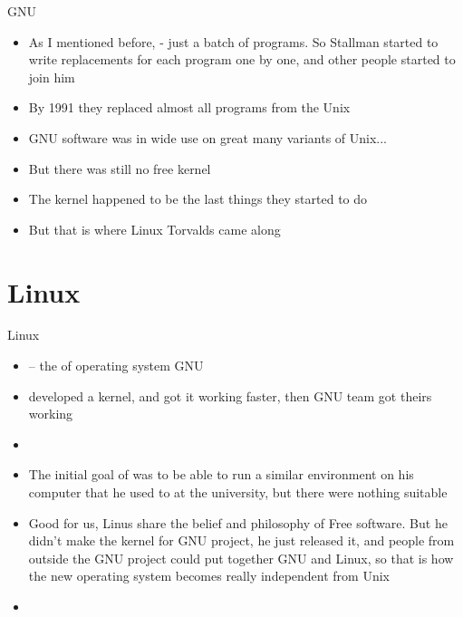 \documentclass[usenames,dvipsnames,10pt,aspectratio=169]{beamer}
\begin{document}
\begin{frame}{GNU}
    \begin{itemize}
        \item As I mentioned before,  - just a batch of programs. So Stallman started to write replacements for each program one by one, and other people started to join him
        \item By 1991 they replaced almost all programs from the Unix
        \item GNU software was in wide use on great many variants of Unix...
        \item But there was still no free kernel
        \item The kernel happened to be the last things they started to do
        \item But that is where Linux Torvalds came along
    \end{itemize}
\end{frame}

\section{Linux}

\begin{frame}{Linux}
    \begin{itemize}
        \item {} -- the  of operating system GNU
        \item {}  developed a kernel, and got it working faster, then GNU team got theirs working
        \item {}
        \item The initial goal of  was to be able to run a similar environment on his computer that he used to at the university, but there were nothing suitable
        \item Good for us, Linus share the belief and philosophy of Free software. But he didn't make the kernel for GNU project, he just released it, and people from outside the GNU project could put together GNU and Linux, so that is how the new operating system becomes really independent from Unix
        \item {}
    \end{itemize}
\end{frame}
\end{document}
